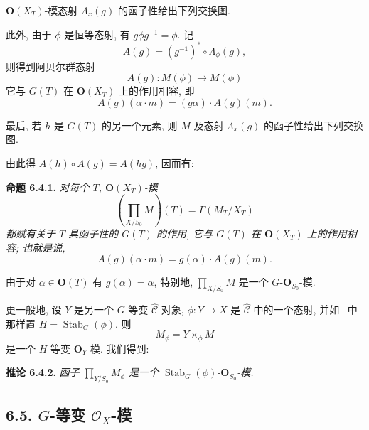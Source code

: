 \(\mathbf O(X_T)\)-模态射 \(\Lambda_x(g)\) 的函子性给出下列交换图.

\begin{figure}[H]
  \centering
  
  \label{fig:sga3-exp1-p042-section-naturality-square}
\end{figure}

此外, 由于 \(\phi\) 是恒等态射, 有 \(g\phi g^{-1}=\phi\).
记
\[
  A(g)=(g^{-1})^*\circ\Lambda_\phi(g),
\]
则得到阿贝尔群态射
\[
  A(g):M(\phi)\longrightarrow M(\phi)
\]
它与 \(G(T)\) 在 \(\mathbf O(X_T)\) 上的作用相容, 即
\[
  A(g)(\alpha\cdot m)=(g\alpha)\cdot A(g)(m).
\]

最后, 若 \(h\) 是 \(G(T)\) 的另一个元素, 则 \(M\) 及态射
\(\Lambda_x(g)\) 的函子性给出下列交换图.

\begin{figure}[H]
  \centering
  
  \label{fig:sga3-exp1-p042-section-action-composition}
\end{figure}

由此得 \(A(h)\circ A(g)=A(hg)\), 因而有:

\medskip
\noindent{}\textbf{命题 6.4.1.}
\textit{对每个 \(T\), \(\mathbf O(X_T)\)-模
\[
  \left(\prod_{X/S_0}M\right)(T)=\Gamma(M_T/X_T)
\]
都赋有关于 \(T\) 具函子性的 \(G(T)\) 的作用, 它与 \(G(T)\) 在
\(\mathbf O(X_T)\) 上的作用相容; 也就是说,}
\[
  A(g)(\alpha\cdot m)=g(\alpha)\cdot A(g)(m).
\]

由于对 \(\alpha\in\mathbf O(T)\) 有 \(g(\alpha)=\alpha\),
特别地, \(\prod_{X/S_0}M\) 是一个
\(G\)-\(\mathbf O_{S_0}\)-模.

更一般地, 设 \(Y\) 是另一个 \(G\)-等变
\(\widehat{\mathscr C}\)-对象, \(\phi:Y\to X\) 是
\(\widehat{\mathscr C}\) 中的一个态射, 并如~
中那样置 \(H=\operatorname{Stab}_G(\phi)\). 则
\[
  M_\phi=Y\times_\phi M
\]
是一个 \(H\)-等变 \(\mathbf O_Y\)-模. 我们得到:

\medskip
\noindent{}\textbf{推论 6.4.2.}
\textit{函子 \(\prod_{Y/S_0}M_\phi\) 是一个
\(\operatorname{Stab}_G(\phi)\)-\(\mathbf O_{S_0}\)-模.}

\subsection*{6.5. \(G\)-等变 \(\mathcal O_X\)-模}


